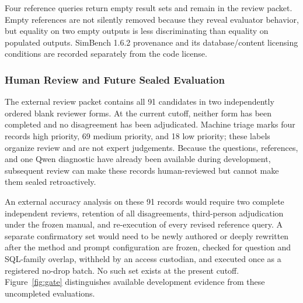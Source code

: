\documentclass[applsci,article,submit,moreauthors]{Definitions/mdpi}
\begin{document}
Four reference queries return empty result sets and remain in the review packet. Empty references are not silently removed because they reveal evaluator behavior, but equality on two empty outputs is less discriminating than equality on populated outputs. SimBench 1.6.2 provenance and its database/content licensing conditions are recorded separately from the code license.

\begin{table}[H]
\caption{Data resources and their permitted evidence role. Automatic denotes machine-constructed candidates that have not completed independent expert review.}\label{tab:data}
\centering{}
\end{table}

\subsubsection{Human Review and Future Sealed Evaluation}
The external review packet contains all 91 candidates in two independently ordered blank reviewer forms. At the current cutoff, neither form has been completed and no disagreement has been adjudicated. Machine triage marks four records high priority, 69 medium priority, and 18 low priority; these labels organize review and are not expert judgements. Because the questions, references, and one Qwen diagnostic have already been available during development, subsequent review can make these records human-reviewed but cannot make them sealed retroactively.

An external accuracy analysis on these 91 records would require two complete independent reviews, retention of all disagreements, third-person adjudication under the frozen manual, and re-execution of every revised reference query. A separate confirmatory set would need to be newly authored or deeply rewritten after the method and prompt configuration are frozen, checked for question and SQL-family overlap, withheld by an access custodian, and executed once as a registered no-drop batch. No such set exists at the present cutoff. Figure~\ref{fig:gate} distinguishes available development evidence from these uncompleted evaluations.
\end{document}
